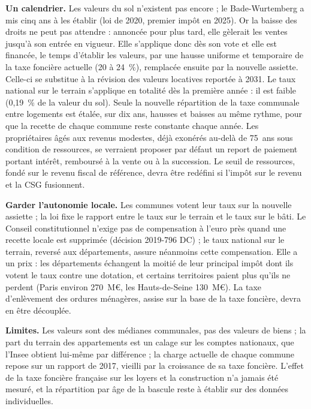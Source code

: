 \documentclass[11pt,a4paper]{article}
\begin{document}
\textbf{Un calendrier.} Les valeurs du sol n'existent pas encore ; le Bade-Wurtemberg a mis cinq ans à les
établir (loi de 2020, premier impôt en 2025). Or la baisse des droits ne peut pas attendre : annoncée pour
plus tard, elle gèlerait les ventes jusqu'à son entrée en vigueur. Elle s'applique donc dès son vote et
elle est financée, le temps d'établir les valeurs, par une hausse uniforme et temporaire de la taxe foncière
actuelle (20 à 24~\%), remplacée ensuite par la nouvelle assiette. Celle-ci se substitue à la révision des
valeurs locatives reportée à 2031. Le taux national sur le terrain s'applique en totalité dès la première
année : il est faible (0,19~\% de la valeur du sol). Seule la nouvelle répartition de la taxe communale entre
logements est étalée, sur dix ans, hausses et baisses au même rythme, pour que la recette de chaque commune
reste constante chaque année. Les propriétaires âgés aux revenus modestes, déjà exonérés au-delà de 75~ans
sous condition de ressources, se verraient proposer par défaut un report de paiement portant intérêt,
remboursé à la vente ou à la succession. Le seuil de ressources, fondé sur le revenu fiscal de référence,
devra être redéfini si l'impôt sur le revenu et la CSG fusionnent.

\textbf{Garder l'autonomie locale.} Les communes votent leur taux sur la nouvelle assiette ; la loi fixe le
rapport entre le taux sur le terrain et le taux sur le bâti. Le Conseil constitutionnel n'exige pas de
compensation à l'euro près quand une recette locale est supprimée (décision 2019-796 DC) ; le taux national
sur le terrain, reversé aux départements, assure néanmoins cette compensation. Elle a un prix : les
départements échangent la moitié de leur principal impôt dont ils votent le taux contre une dotation, et
certains territoires paient plus qu'ils ne perdent (Paris environ 270~M€, les Hauts-de-Seine 130~M€). La taxe
d'enlèvement des ordures ménagères, assise sur la base de la taxe foncière, devra en être découplée.

\textbf{Limites.} Les valeurs sont des médianes communales, pas des valeurs de biens ; la part du terrain
des appartements est un calage sur les comptes nationaux, que l'Insee obtient lui-même par différence ; la
charge actuelle de chaque commune repose sur un rapport de 2017, vieilli par la croissance de sa taxe
foncière. L'effet de la taxe foncière française sur
les loyers et la construction n'a jamais été mesuré, et la répartition par âge de la bascule reste à
établir sur des données individuelles.
\end{document}
